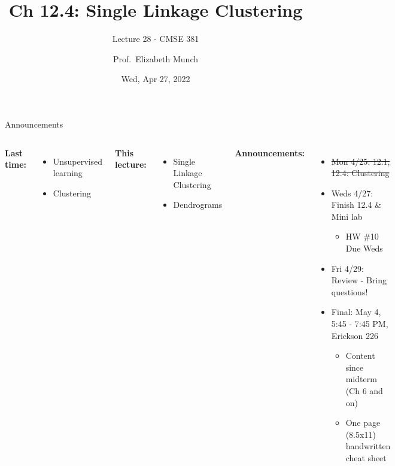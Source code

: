 \documentclass[aspectratio=169,usenames,dvipsnames]{beamer}
\begin{document}
\title[]{Ch 12.4: Single Linkage Clustering}
\subtitle{Lecture 28 - CMSE 381}
\date{Wed, Apr 27, 2022}



\author[Dr.~Munch]{Prof.~Elizabeth Munch}

\begin{frame}
 \titlepage


\end{frame}
\begin{frame}[c]{Announcements }

\begin{columns}
\centering

	\textbf{Last time:}
	\begin{itemize}
	\item Unsupervised learning
	\item Clustering
	\end{itemize}

	\vspace{.2in}

	\textbf{This lecture:}
	\begin{itemize}
		\item Single Linkage Clustering
		\item Dendrograms
\end{itemize}


\centering

\textbf{Announcements:}
	\begin{itemize}
	\item \sout{Mon 4/25: 12.1, 12.4: Clustering}
	\item Weds 4/27: Finish 12.4 \& Mini lab
	\begin{itemize}
		\item HW \#10 Due Weds
	\end{itemize}
	\item Fri 4/29: Review - Bring questions!
	\item Final: May 4, 5:45 - 7:45 PM, Erickson 226
	\begin{itemize}
		\item Content since midterm (Ch 6 and on)
		\item One page (8.5x11) handwritten cheat sheet
	\end{itemize}
	\end{itemize}
\end{columns}

\end{frame}
\end{document}
